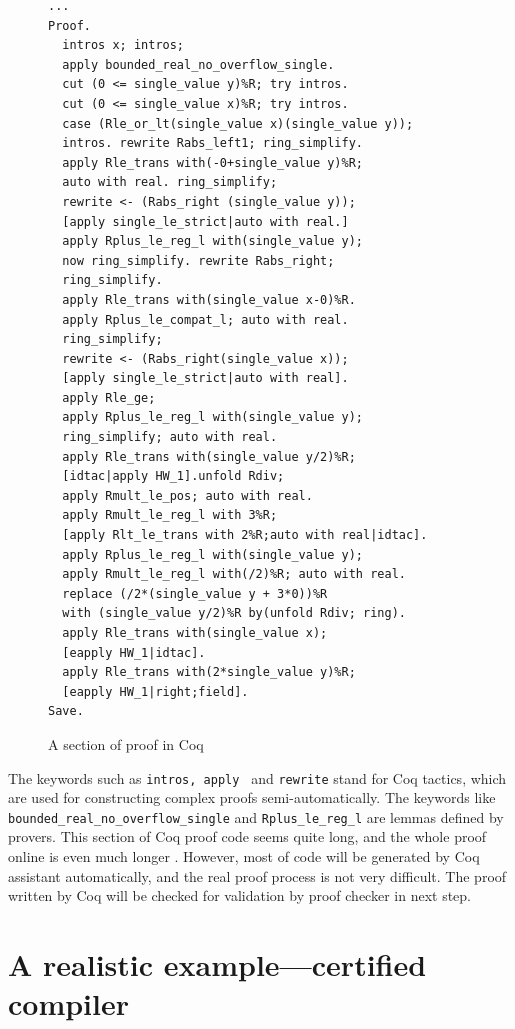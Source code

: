 \documentclass[10pt, conference, compsocconf]{IEEEtran}
\begin{document}
\begin{figure}[H]
\begin{lstlisting}[label=Coq]
...
Proof.
  intros x; intros; 
  apply bounded_real_no_overflow_single.
  cut (0 <= single_value y)%R; try intros.
  cut (0 <= single_value x)%R; try intros.
  case (Rle_or_lt(single_value x)(single_value y)); 
  intros. rewrite Rabs_left1; ring_simplify.
  apply Rle_trans with(-0+single_value y)%R;
  auto with real. ring_simplify; 
  rewrite <- (Rabs_right (single_value y));
  [apply single_le_strict|auto with real.]
  apply Rplus_le_reg_l with(single_value y); 
  now ring_simplify. rewrite Rabs_right; 
  ring_simplify.
  apply Rle_trans with(single_value x-0)%R.
  apply Rplus_le_compat_l; auto with real.
  ring_simplify; 
  rewrite <- (Rabs_right(single_value x));
  [apply single_le_strict|auto with real].
  apply Rle_ge; 
  apply Rplus_le_reg_l with(single_value y); 
  ring_simplify; auto with real.
  apply Rle_trans with(single_value y/2)%R;
  [idtac|apply HW_1].unfold Rdiv; 
  apply Rmult_le_pos; auto with real.
  apply Rmult_le_reg_l with 3%R;
  [apply Rlt_le_trans with 2%R;auto with real|idtac].
  apply Rplus_le_reg_l with(single_value y); 
  apply Rmult_le_reg_l with(/2)%R; auto with real.
  replace (/2*(single_value y + 3*0))%R 
  with (single_value y/2)%R by(unfold Rdiv; ring).
  apply Rle_trans with(single_value x);
  [eapply HW_1|idtac].
  apply Rle_trans with(2*single_value y)%R;
  [eapply HW_1|right;field].
Save.
\end{lstlisting}    
\caption{A section of proof in Coq}
\end{figure}

The keywords such as \texttt{intros, apply } and \texttt{rewrite} stand for Coq tactics, which are used for constructing complex proofs semi-automatically. The keywords like \texttt{bounded\_real\_no\_overflow\_single} and \texttt{Rplus\_le\_reg\_l} are lemmas defined by provers. This section of Coq proof code seems quite long, and the whole proof online is even much longer \cite{proof}. However, most of code will be generated by Coq assistant automatically, and the real proof process is not very difficult. The proof written by Coq will be checked for validation by proof checker in next step.


\section{A realistic example---certified compiler}
\end{document}

